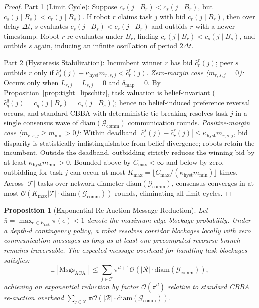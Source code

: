 \documentclass[lettersize,journal]{IEEEtran}
\newtheorem{proposition}{Proposition}
\begin{document}
\begin{proof}
Part 1 (Limit Cycle): Suppose $c_r(j \mid B_r) < c_s(j \mid B_r)$, but $c_s(j \mid B_s) < c_r(j \mid B_s)$. If robot $r$ claims task $j$ with bid $c_r(j \mid B_r)$, then over delay $\Delta t$, $s$ evaluates $c_s(j \mid B_s) < c_r(j \mid B_r)$ and outbids $r$ with a newer timestamp. Robot $r$ re-evaluates under $B_r$, finding $c_r(j \mid B_r) < c_s(j \mid B_s)$, and outbids $s$ again, inducing an infinite oscillation of period $2 \Delta t$.

Part 2 (Hysteresis Stabilization): Incumbent winner $r$ has bid $\hat{c}_r^r(j)$; peer $s$ outbids $r$ only if $\hat{c}_s^s(j) + \kappa_{\text{hyst}} m_{r,s,j} < \hat{c}_r^r(j)$.
\textit{Zero-margin case ($m_{r,s,j} = 0$):} Occurs only when $L_{r,j} = L_{s,j} = 0$ and $\delta_{\text{map}} = 0$. By Proposition~\ref{prop:tight_lipschitz}, task valuation is belief-invariant ($\hat{c}_q^q(j) = c_q(j \mid B_r) = c_q(j \mid B_s)$); hence no belief-induced preference reversal occurs, and standard CBBA with deterministic tie-breaking resolves task $j$ in a single consensus wave of $\mathrm{diam}(\mathcal{G}_{\text{comm}})$ communication rounds.
\textit{Positive-margin case ($m_{r,s,j} \ge m_{\min} > 0$):} Within deadband $|\hat{c}_s^s(j) - \hat{c}_r^r(j)| \le \kappa_{\text{hyst}} m_{r,s,j}$, bid disparity is statistically indistinguishable from belief divergence; robots retain the incumbent. Outside the deadband, outbidding strictly reduces the winning bid by at least $\kappa_{\text{hyst}} m_{\min} > 0$. Bounded above by $C_{\max} < \infty$ and below by zero, outbidding for task $j$ can occur at most $K_{\max} = \lfloor C_{\max} / (\kappa_{\text{hyst}} m_{\min}) \rfloor$ times. Across $|\mathcal{T}|$ tasks over network diameter $\mathrm{diam}(\mathcal{G}_{\text{comm}})$, consensus converges in at most $\mathcal{O}(K_{\max} |\mathcal{T}| \cdot \mathrm{diam}(\mathcal{G}_{\text{comm}}))$ rounds, eliminating all limit cycles.
\end{proof}

\begin{proposition}[Exponential Re-Auction Message Reduction]
Let $\bar{\pi} = \max_{e \in E_{\text{risk}}} \pi(e) < 1$ denote the maximum edge blockage probability. Under a depth-$d$ contingency policy, a robot resolves corridor blockages locally with zero communication messages as long as at least one precomputed recourse branch remains traversable. The expected message overhead for handling task blockages satisfies:
\begin{equation}
    \mathbb{E}[\text{Msgs}_{\text{ACA}}] \le \sum_{j \in \mathcal{T}} \bar{\pi}^{d+1} \mathcal{O}(|\mathcal{R}| \cdot \mathrm{diam}(\mathcal{G}_{\text{comm}})),
\end{equation}
achieving an exponential reduction by factor $\mathcal{O}(\bar{\pi}^d)$ relative to standard CBBA re-auction overhead $\sum_{j \in \mathcal{T}} \bar{\pi} \mathcal{O}(|\mathcal{R}| \cdot \mathrm{diam}(\mathcal{G}_{\text{comm}}))$.
\label{prop:message_reduction}
\end{proposition}
\end{document}
